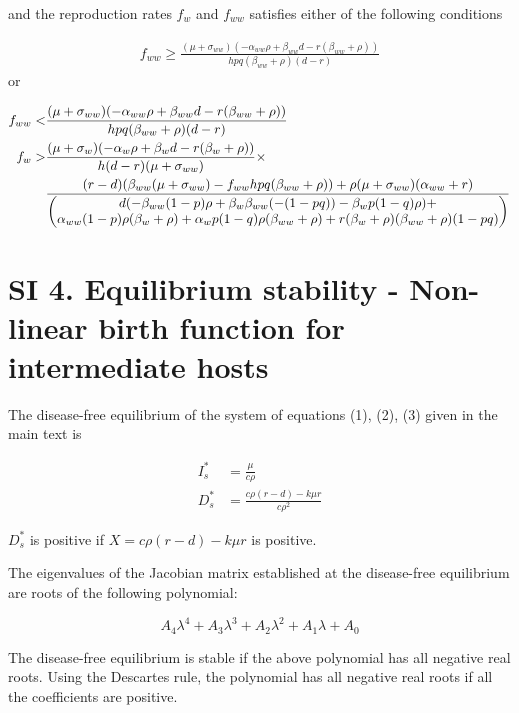\documentclass[11pt]{article}
\begin{document}
and the reproduction rates $f_w$ and $f_{ww}$ satisfies either of the following conditions

\begin{align}
	f_{ww} \geq \frac{(\mu + \sigma_{ww}) (-\alpha_{ww} \rho + \beta_{ww}d-r (\beta_{ww}+\rho ))}{h p q (\beta_{ww}+\rho ) (d-r)}
\end{align}
or

\begin{align}
	f_{ww} < &  \frac{(\mu + \sigma_{ww}) (-\alpha_{ww} \rho + \beta_{ww}d-r (\beta_{ww}+\rho ))}{h p q (\beta_{ww}+\rho ) (d-r)} \notag \\
	f_w > & \frac{(\mu + \sigma_w) (- \alpha_w \rho + \beta_w d-r (\beta_w+\rho ))}{h (d-r) (\mu + \sigma_{ww})} \times  \\
	          & \frac{(r-d) (\beta_{ww} (\mu + \sigma_{ww}) - f_{ww} h p q (\beta_{ww}+\rho ))+\rho  (\mu +\sigma_{ww}) (\alpha_{ww} + r)}{\begin{pmatrix}
	          		d (-\beta_{ww} (1-p) \rho +\beta_w \beta_{ww} (-(1-p q))-\beta_w p (1-q) \rho ) + \\
	          		\alpha_{ww} (1-p) \rho  (\beta_w+\rho )+\alpha_w p (1-q) \rho  (\beta_{ww}+\rho )+r (\beta_w+\rho ) (\beta_{ww}+\rho ) (1-p q)
	          	\end{pmatrix}}
\end{align}

\section*{SI 4. Equilibrium stability - Non-linear birth function for intermediate hosts }
The disease-free equilibrium of the system of equations (1), (2), (3) given in the main text is

\begin{align}
	I_s^* & = \frac{\mu}{c \rho} \\
	D_s^* & = \frac{c \rho  (r-d)-k \mu  r}{c \rho^2}
\end{align}

$D_s^*$ is positive if $X = c \rho  (r-d)-k \mu  r$ is positive.

The eigenvalues of the Jacobian matrix established at the disease-free equilibrium are roots of the following polynomial:

\begin{equation}
	A_4 \lambda^4 + A_3 \lambda^3 + A_2 \lambda^2 + A_1 \lambda + A_0
\end{equation}

The disease-free equilibrium is stable if the above polynomial has all negative real roots. Using the Descartes rule, the polynomial has all negative real roots if all the coefficients are positive.
\end{document}
